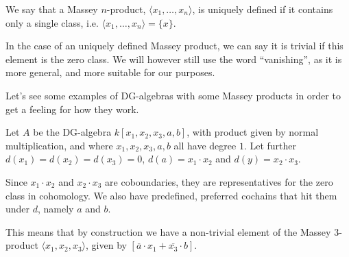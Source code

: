 \begin{definition}
\label{def:uniquely_defined_massey}
We say that a Massey $n$-product, $\langle x_1, \ldots, x_n\rangle$, is uniquely defined if it contains only a single class, i.e. $\langle x_1, \ldots, x_n\rangle=\{x\}$. 
\end{definition}

In the case of an uniquely defined Massey product, we can say it is trivial if this element is the zero class. We will however still use the word ``vanishing'', as it is more general, and more suitable for our purposes. 

Let's see some examples of DG-algebras with some Massey products in order to get a feeling for how they work. 

\begin{example}
Let $A$ be the DG-algebra $k[x_1,x_2,x_3,a,b]$, with product given by normal multiplication, and where $x_1, x_2, x_3, a, b$ all have degree $1$. Let further $d(x_1)=d(x_2)=d(x_3)=0$, $d(a)=x_1\cdot x_2$ and $d(y)=x_2\cdot x_3$. 

Since $x_1\cdot x_2$ and $x_2\cdot x_3$ are coboundaries, they are representatives for the zero class in cohomology. We also have predefined, preferred cochains that hit them under $d$, namely $a$ and $b$. 

This means that by construction we have a non-trivial element of the Massey 3-product $\langle x_1, x_2, x_3\rangle$, given by $[\overline{a}\cdot x_1 + \overline{x_3}\cdot b]$. 
\end{example}

